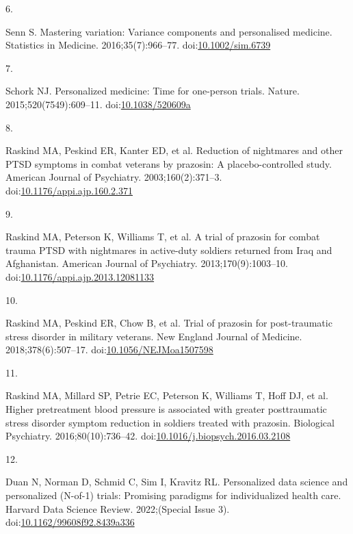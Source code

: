 \documentclass[
  11pt,
]{article}
\newlength{\cslhangindent}
\newlength{\csllabelwidth}
\newenvironment{CSLReferences}[2] %
 {\begin{list}{}{%
  \setlength{\itemindent}{0pt}
  \setlength{\leftmargin}{0pt}
  \setlength{\parsep}{0pt}
  \ifodd #1
   \setlength{\leftmargin}{\cslhangindent}
   \setlength{\itemindent}{-1\cslhangindent}
  \fi
  \setlength{\itemsep}{#2\baselineskip}}}
 {\end{list}}
\newcommand{\CSLLeftMargin}[1]{\parbox[t]{\csllabelwidth}{\strut#1\strut}}
\newcommand{\CSLRightInline}[1]{\parbox[t]{\linewidth - \csllabelwidth}{\strut#1\strut}}
\begin{document}
\begin{CSLReferences}{0}{1}
\CSLLeftMargin{6. }%
\CSLRightInline{Senn S. Mastering variation: Variance components and personalised medicine. Statistics in Medicine. 2016;35(7):966--77. doi:\href{https://doi.org/10.1002/sim.6739}{10.1002/sim.6739}}

\CSLLeftMargin{7. }%
\CSLRightInline{Schork NJ. Personalized medicine: Time for one-person trials. Nature. 2015;520(7549):609--11. doi:\href{https://doi.org/10.1038/520609a}{10.1038/520609a}}

\CSLLeftMargin{8. }%
\CSLRightInline{{Raskind MA, Peskind ER, Kanter ED, et al.} Reduction of nightmares and other {PTSD} symptoms in combat veterans by prazosin: A placebo-controlled study. American Journal of Psychiatry. 2003;160(2):371--3. doi:\href{https://doi.org/10.1176/appi.ajp.160.2.371}{10.1176/appi.ajp.160.2.371}}

\CSLLeftMargin{9. }%
\CSLRightInline{{Raskind MA, Peterson K, Williams T, et al.} A trial of prazosin for combat trauma {PTSD} with nightmares in active-duty soldiers returned from {Iraq} and {Afghanistan}. American Journal of Psychiatry. 2013;170(9):1003--10. doi:\href{https://doi.org/10.1176/appi.ajp.2013.12081133}{10.1176/appi.ajp.2013.12081133}}

\CSLLeftMargin{10. }%
\CSLRightInline{{Raskind MA, Peskind ER, Chow B, et al.} Trial of prazosin for post-traumatic stress disorder in military veterans. New England Journal of Medicine. 2018;378(6):507--17. doi:\href{https://doi.org/10.1056/NEJMoa1507598}{10.1056/NEJMoa1507598}}

\CSLLeftMargin{11. }%
\CSLRightInline{Raskind MA, Millard SP, Petrie EC, Peterson K, Williams T, Hoff DJ, et al. Higher pretreatment blood pressure is associated with greater posttraumatic stress disorder symptom reduction in soldiers treated with prazosin. Biological Psychiatry. 2016;80(10):736--42. doi:\href{https://doi.org/10.1016/j.biopsych.2016.03.2108}{10.1016/j.biopsych.2016.03.2108}}

\CSLLeftMargin{12. }%
\CSLRightInline{Duan N, Norman D, Schmid C, Sim I, Kravitz RL. Personalized data science and personalized ({N}-of-1) trials: Promising paradigms for individualized health care. Harvard Data Science Review. 2022;(Special Issue 3). doi:\href{https://doi.org/10.1162/99608f92.8439a336}{10.1162/99608f92.8439a336}}


\end{CSLReferences}
\end{document}
